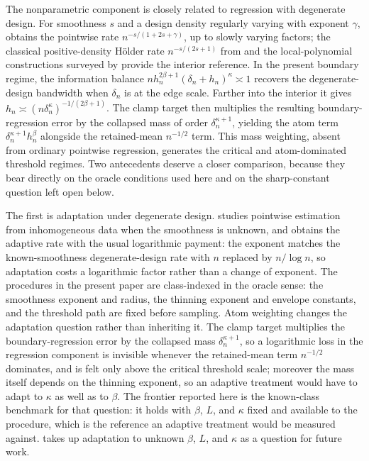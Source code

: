 The nonparametric component is closely related to regression with degenerate design. For smoothness \(s\) and a design density regularly varying with exponent \(\gamma\), \citet{Gaiffas2005DegenerateDesign} obtains the pointwise rate \(n^{-s/(1+2s+\gamma)}\), up to slowly varying factors; the classical positive-density Hölder rate \(n^{-s/(2s+1)}\) from \citet{Stone1982} and the local-polynomial constructions surveyed by \citet{Fan1996} provide the interior reference. In the present boundary regime, the information balance \(n h_n^{2\beta+1}(\delta_n+h_n)^\kappa\asymp1\) recovers the degenerate-design bandwidth when \(\delta_n\) is at the edge scale. Farther into the interior it gives \(h_n\asymp(n\delta_n^\kappa)^{-1/(2\beta+1)}\). The clamp target then multiplies the resulting boundary-regression error by the collapsed mass of order \(\delta_n^{\kappa+1}\), yielding the atom term \(\delta_n^{\kappa+1}h_n^\beta\) alongside the retained-mean \(n^{-1/2}\) term. This mass weighting, absent from ordinary pointwise regression, generates the critical and atom-dominated threshold regimes.  Two antecedents deserve a closer comparison, because they bear directly on the oracle conditions used here and on the sharp-constant question left open below.

The first is adaptation under degenerate design.  \citet{Gaiffas2007Inhomogeneous} studies pointwise estimation from inhomogeneous data when the smoothness is unknown, and obtains the adaptive rate with the usual logarithmic payment: the exponent matches the known-smoothness degenerate-design rate with \(n\) replaced by \(n/\log n\), so adaptation costs a logarithmic factor rather than a change of exponent.  The procedures in the present paper are class-indexed in the oracle sense: the smoothness exponent and radius, the thinning exponent and envelope constants, and the threshold path are fixed before sampling.  Atom weighting changes the adaptation question rather than inheriting it.  The clamp target multiplies the boundary-regression error by the collapsed mass \(\delta_n^{\kappa+1}\), so a logarithmic loss in the regression component is invisible whenever the retained-mean term \(n^{-1/2}\) dominates, and is felt only above the critical threshold scale; moreover the mass itself depends on the thinning exponent, so an adaptive treatment would have to adapt to \(\kappa\) as well as to \(\beta\).  The frontier reported here is the known-class benchmark for that question: it holds with \(\beta\), \(L\), and \(\kappa\) fixed and available to the procedure, which is the reference an adaptive treatment would be measured against.   takes up adaptation to unknown \(\beta\), \(L\), and \(\kappa\) as a question for future work.

